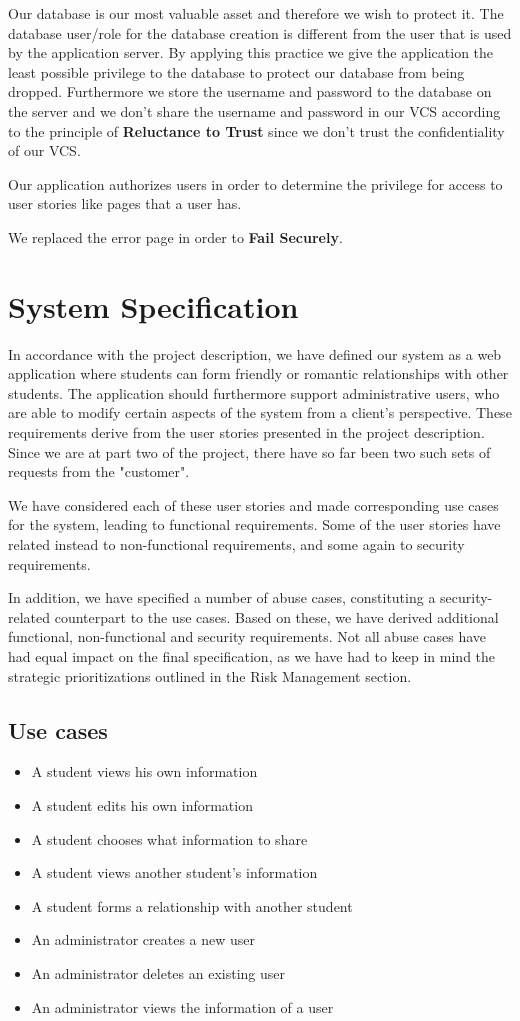 \documentclass[a4paper]{article}
\begin{document}
Our database is our most valuable asset and therefore we wish to protect it. The database user/role for the database creation is different from the user that is used by the application server. By applying this practice we give the application the least possible privilege to the database to protect our database from being dropped. Furthermore we store the username and password to the database on the server and we don't share the username and password in our VCS according to the principle of \textbf{Reluctance to Trust} since we don't trust the confidentiality of our VCS.

Our application authorizes users in order to determine the privilege for access to user stories like pages that a user has.

We replaced the error page in order to \textbf{Fail Securely}.

\section{System Specification}
In accordance with the project description, we have defined our system as a web application where students can form friendly or romantic relationships with other students. The application should furthermore support administrative users, who are able to modify certain aspects of the system from a client's perspective. These requirements derive from the user stories presented in the project description. Since we are at part two of the project, there have so far been two such sets of requests from the "customer".

We have considered each of these user stories and made corresponding use cases for the system, leading to functional requirements. Some of the user stories have related instead to non-functional requirements, and some again to security requirements.

In addition, we have specified a number of abuse cases, constituting a security-related counterpart to the use cases. Based on these, we have derived additional functional, non-functional and security requirements. Not all abuse cases have had equal impact on the final specification, as we have had to keep in mind the strategic prioritizations outlined in the Risk Management section.

\subsection{Use cases}
\begin{itemize}
\item A student views his own information
\item A student edits his own information
\item A student chooses what information to share
\item A student views another student’s information
\item A student forms a relationship with another student
\item An administrator creates a new user
\item An administrator deletes an existing user
\item An administrator views the information of a user
\end{itemize}
\end{document}

